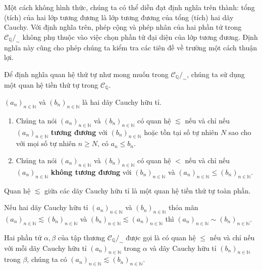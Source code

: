 Một cách không hình thức, chúng ta có thể diễn đạt định nghĩa trên thành: tổng (tích) của hai lớp tương đương là lớp tương đương của tổng (tích) hai dãy Cauchy. Với định nghĩa trên, phép cộng và phép nhân của hai phần tử trong $\mathscr{C}_{\mathbb{Q}}/_{\sim}$ không phụ thuộc vào việc chọn phần tử đại diện của lớp tương đương. Định nghĩa này cũng cho phép chúng ta kiểm tra các tiên đề về trường một cách thuận lợi.

Để định nghĩa quan hệ thứ tự như mong muốn trong $\mathscr{C}_{\mathbb{Q}}/_{\sim}$, chúng ta sử dụng một quan hệ tiền thứ tự trong $\mathscr{C}_{\mathbb{Q}}$.

\begin{definition}
	${(a_{n})}_{n\in\mathbb{N}}$ và ${(b_{n})}_{n\in\mathbb{N}}$ là hai dãy Cauchy hữu tỉ.
	\begin{enumerate}[label={(\roman*)}]
		\item Chúng ta nói ${(a_{n})}_{n\in\mathbb{N}}$ và ${(b_{n})}_{n\in\mathbb{N}}$ có quan hệ $\lesssim$ nếu và chỉ nếu ${(a_{n})}_{n\in\mathbb{N}}$ \textbf{tương đương} với ${(b_{n})}_{n\in\mathbb{N}}$ hoặc tồn tại số tự nhiên $N$ sao cho với mọi số tự nhiên $n\geq N$, có $a_{n}\leq b_{n}$.
		\item Chúng ta nói ${(a_{n})}_{n\in\mathbb{N}}$ và ${(b_{n})}_{n\in\mathbb{N}}$ có quan hệ $<$ nếu và chỉ nếu ${(a_{n})}_{n\in\mathbb{N}}$ \textbf{không tương đương} với ${(b_{n})}_{n\in\mathbb{N}}$ và ${(a_{n})}_{n\in\mathbb{N}}\leq {(b_{n})}_{n\in\mathbb{N}}$.
	\end{enumerate}
\end{definition}

\begin{theorem}
	Quan hệ $\lesssim$ giữa các dãy Cauchy hữu tỉ là một quan hệ tiền thứ tự toàn phần.
\end{theorem}

\begin{theorem}\label{theorem:preorder-and-equivalence-relation-between-rational-cauchy-sequences}
	Nếu hai dãy Cauchy hữu tỉ ${(a_{n})}_{n\in\mathbb{N}}$ và ${(b_{n})}_{n\in\mathbb{N}}$ thỏa mãn ${(a_{n})}_{n\in\mathbb{N}}\lesssim {(b_{n})}_{n\in\mathbb{N}}$ và ${(b_{n})}_{n\in\mathbb{N}}\lesssim {(a_{n})}_{n\in\mathbb{N}}$ thì ${(a_{n})}_{n\in\mathbb{N}}\sim {(b_{n})}_{n\in\mathbb{N}}$.
\end{theorem}

\begin{definition}
	Hai phần tử $\alpha, \beta$ của tập thương $\mathscr{C}_{\mathbb{Q}}/_{\sim}$ được gọi là có quan hệ $\leq$ nếu và chỉ nếu với mỗi dãy Cauchy hữu tỉ ${(a_{n})}_{n\in\mathbb{N}}$ trong $\alpha$ và dãy Cauchy hữu tỉ ${(b_{n})}_{n\in\mathbb{N}}$ trong $\beta$, chúng ta có ${(a_{n})}_{n\in\mathbb{N}}\lesssim {(b_{n})}_{n\in\mathbb{N}}$.
\end{definition}

